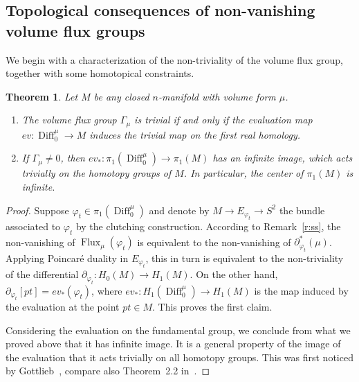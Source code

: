 \documentclass[12pt]{amsart}
\newtheorem{theorem}{Theorem}%
\theoremstyle{definition}
\theoremstyle{remark}
\def\bR{{\mathbb R}}
\newcommand\Flux{\operatorname{Flux}}
\newcommand\Diff{\operatorname{Diff}}
\begin{document}
\subsection{Topological consequences of non-vanishing volume flux groups}
We begin with a characterization of the non-triviality of the volume 
flux group, together with some homotopical constraints.
\begin{theorem}\label{p:vol-flux}
Let $M$ be any closed $n$-manifold with volume form $\mu$.
\begin{enumerate}
\item The volume flux group $\Gamma_{\mu}$ is trivial if and only if
the evaluation map $ev\colon\Diff^{\mu}_0 \to M$ induces the
trivial map on the first real homology.
\item If $\Gamma_{\mu}\neq 0$, then $ev_{*}\colon\pi_{1}(\Diff^{\mu}_0) \to 
\pi_{1}(M)$ has an infinite image, which acts trivially on the 
homotopy groups of $M$. In particular, the center of $\pi_{1}(M)$ is 
infinite.
\end{enumerate}
\end{theorem}
\begin{proof}
Suppose $\varphi_{t} \in \pi_1(\Diff^{\mu}_0)$ 
and denote by $M\to E_{\varphi_{t}}\to S^2$ the bundle associated
to $\varphi_{t}$ by the clutching construction.
According to Remark~\ref{r:ss}, the non-vanishing of 
$\Flux_{\mu}(\varphi_{t})$ is equivalent to the non-vanishing of
$\partial^*_{\varphi_{t}}(\mu )$. Applying Poincar\'e
duality in $E_{\varphi_{t}}$, this in turn is equivalent to the 
non-triviality of the differential
$\partial_{\varphi_{t}}\colon H_{0}(M)\to H_{1}(M)$.
On the other hand, $\partial_{\varphi_{t}}[pt] = ev_*(\varphi_{t})$,
where $ev_*\colon H_1(\Diff^{\mu}_0)\to H_1(M)$ is the map
induced by the evaluation at the point $pt\in M$.
This proves the first claim.

Considering the evaluation on the fundamental group, we conclude from 
what we proved above that it has infinite image. It is a general 
property of the image of the evaluation that it acts trivially on all 
homotopy groups. This was first noticed by Gottlieb~\cite{G0},
compare also Theorem~2.2 in~\cite{Oprea}. 
\end{proof}
\end{document}
